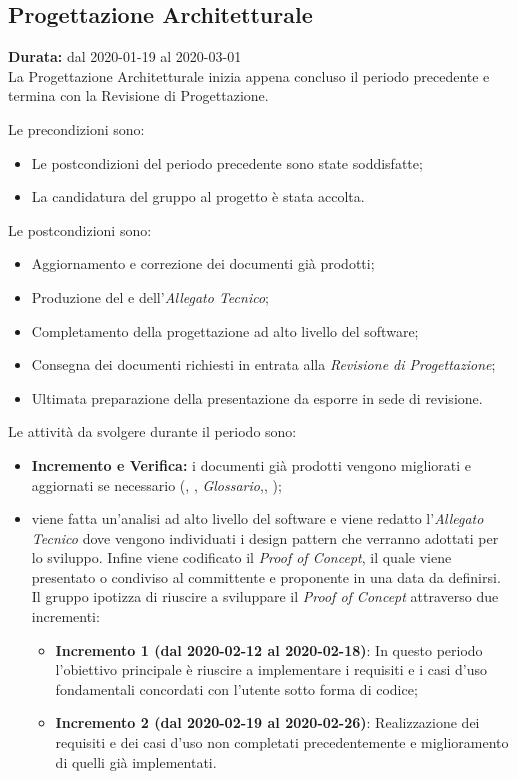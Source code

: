 \subsection{Progettazione Architetturale}
\label{progettazione_architetturale}
\textbf{Durata:} dal 2020-01-19 al 2020-03-01
\\La Progettazione Architetturale inizia appena concluso il periodo precedente e termina con la Revisione di Progettazione.

Le precondizioni sono:
\begin{itemize}
    \item Le postcondizioni del periodo precedente sono state soddisfatte;
    \item La candidatura del gruppo al progetto {\NomeProgetto} è stata accolta.
\end{itemize}

Le postcondizioni sono:
\begin{itemize}
    \item Aggiornamento e correzione dei documenti già prodotti;
    \item Produzione del  e dell'\textit{Allegato Tecnico};
    \item Completamento della progettazione ad alto livello del software;
    \item Consegna dei documenti richiesti in entrata alla \textit{Revisione di Progettazione};
    \item Ultimata preparazione della presentazione da esporre in sede di revisione.
\end{itemize}
Le attività da svolgere durante il periodo sono:
\begin{itemize}
    \item \textbf{Incremento e Verifica:} i documenti già prodotti vengono migliorati e aggiornati se necessario (\textit{\NdP}, \textit{\PdP}, \textit{Glossario},\textit{\PdQ}, \textit{\AdR});
    \item {} viene fatta un'analisi ad alto livello del software e viene redatto l'\textit{Allegato Tecnico} dove vengono individuati i design pattern che verranno adottati per lo sviluppo. Infine viene codificato il \textit{Proof of Concept}, il quale viene presentato o condiviso al committente e proponente in una data da definirsi. Il gruppo ipotizza di riuscire a sviluppare il {\textit{Proof of Concept}} attraverso due incrementi:
    \begin{itemize}
        \item \textbf{Incremento 1 (dal 2020-02-12 al 2020-02-18)}: In questo periodo l'obiettivo principale è riuscire a implementare i requisiti e i casi d'uso fondamentali concordati con l'utente sotto forma di codice;
        \item \textbf{Incremento 2 (dal 2020-02-19 al 2020-02-26)}: Realizzazione dei requisiti e dei casi d'uso non completati precedentemente e miglioramento di quelli già implementati.
    \end{itemize}
\end{itemize}


